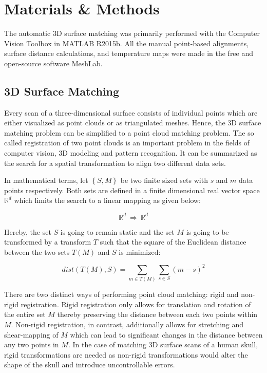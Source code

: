 \documentclass[a4paper]{article}
\begin{document}
\section{Materials \& Methods} %
The automatic 3D surface matching was primarily performed with the Computer Vision Toolbox in MATLAB R2015b. All the manual point-based alignments, surface distance calculations, and temperature maps were made in the free and open-source software MeshLab.

\subsection{3D Surface Matching} %
Every scan of a three-dimensional surface consists of individual points which are either visualized as point clouds or as triangulated meshes. Hence, the 3D surface matching problem can be simplified to a point cloud matching problem. The so called registration of two point clouds is an important problem in the fields of computer vision, 3D modeling and pattern recognition. It can be summarized as the search for a spatial transformation to align two different data sets.

In mathematical terms, let $\left\{ S,M \right\}$ be two finite sized sets with $s$ and $m$ data points respectively. Both sets are defined in a finite dimensional real vector space ${\mathbb{R}}^{ d }$ which limits the search to a linear mapping as given below:

\begin{equation}
{\mathbb{R}}^{ d }\: \Longrightarrow \: {\mathbb{R}}^{ d }
\end{equation}

Hereby, the set $S$ is going to remain static and the set $M$ is going to be transformed by a transform $T$ such that the square of the Euclidean distance between the two sets $T({ M })$ and $S$ is minimized:

\begin{equation}
{ dist }(T({ M }),{ S })=\sum _{ m\in T({ M }) } \sum _{ s\in { S } } (m-s)^{ 2 }
\end{equation}

There are two distinct ways of performing point cloud matching: rigid and non-rigid registration. Rigid registration only allows for translation and rotation of the entire set $M$ thereby preserving the distance between each two points within $M$. Non-rigid registration, in contrast, additionally allows for stretching and shear-mapping of $M$ which can lead to significant changes in the distance between any two points in $M$. In the case of matching 3D surface scans of a human skull, rigid transformations are needed as non-rigid transformations would alter the shape of the skull and introduce uncontrollable errors.
\end{document}
